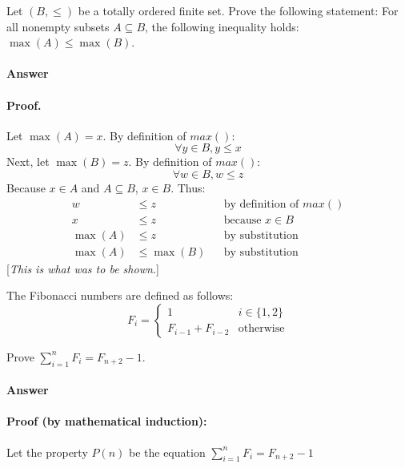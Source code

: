 \documentclass{article}
\begin{document}
Let $(B,\leq)$ be a totally ordered finite set. Prove the following
statement: For all nonempty subsets $A \subseteq B$, the following inequality
holds: $\max(A) \leq \max(B)$.

\paragraph{Answer}
\paragraph{Proof.}

Let $\max(A) = x$. By definition of $max()$: $$\forall y \in B, y \leq x$$ Next, let $\max(B) = z$. By definition of $max()$: $$\forall w \in B, w \leq z$$
Because $x \in A$ and $A \subseteq B$, $x \in B$. Thus:
\begin{align}
        \nonumber w &\leq z &&\text{by definition of $max()$}\\ \nonumber x &\leq z &&\text{because $x \in B$}\\ \nonumber \max(A) &\leq z &&\text{by substitution} \\ \nonumber \max(A) &\leq \max(B) &&\text{by substitution}
\end{align}
[\emph{This is what was to be shown.}]


\collab{} 

The Fibonacci numbers are defined as follows:
$$
    F_i = \begin{cases}
            1 & i \in \{1,2\} \\
            F_{i-1}+F_{i-2} & \text{otherwise}
          \end{cases}
$$

Prove $\sum_{i=1}^n F_i = F_{n+2}-1$.

\paragraph{Answer}
\paragraph{Proof (by mathematical induction):}

Let the property $P(n)$ be the equation $\sum_{i=1}^n F_i = F_{n+2}-1$
\end{document}
